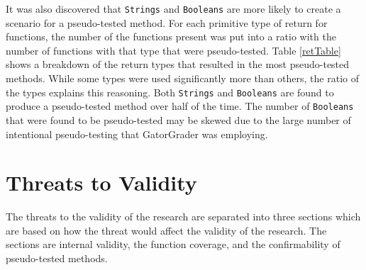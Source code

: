 It was also discovered that \texttt{Strings} and \texttt{Booleans} are more likely to create a scenario for a pseudo-tested method. For each primitive type of return for functions, the number of the functions present was put into a ratio with the number of functions with that type that were pseudo-tested. Table \ref{retTable} shows a breakdown of the return types that resulted in the most pseudo-tested methods. While some types were used significantly more than others, the ratio of the types explains this reasoning. Both \texttt{Strings} and \texttt{Booleans} are found to produce a pseudo-tested method over half of the time. The number of \texttt{Booleans} that were found to be pseudo-tested may be skewed due to the large number of intentional pseudo-testing that GatorGrader was employing.







%

%

\section{Threats to Validity}
The threats to the validity of the research are separated into three sections which are based on how the threat would affect the validity of the research. The sections are internal validity, the function coverage, and the confirmability of pseudo-tested methods.

